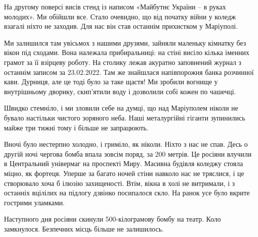 На другому поверсі висів стенд із написом «Майбутнє України – в руках молодих».
Ми обійшли все. Стало очевидно, що від початку війни у коледж взагалі ніхто не
заходив. Для нас він став останнім прихистком у Маріуполі. 

Ми залишился там увісьмох з нашими друзями, зайняли маленьку кімнатку без вікон
під сходами. Вона належала прибиральниці: на стіні висіло кілька іменних грамот
за її взірцеву роботу. На столику лежав акуратно заповнений журнал з останнім
записом за 23.02.2022. Там же знайшлася напівпорожня банка розчинної кави.
Дурниця, але це тоді було за таке щастя! Ми зробили вогнище у внутрішньому
дворику, скип'ятили воду і дозволили собі кожен по чашечці.

Швидко стемніло, і ми зловили себе на думці, що над Маріуполем ніколи не бувало
настільки чистого зоряного неба. Наші металургійні гіганти зупинились майже три
тижні тому і більше не запрацюють.

Вночі було нестерпно холодно, і гриміло, як ніколи. Ніхто з нас не спав. Десь о
другій ночі чергова бомба впала зовсім поряд, за 200 метрів. Це росіяни влучили
в Центральний універмаг на проспекті Миру. Масивна будівля коледжу стояла
міцно, як фортеця. Уперше за багато ночей стіни навколо нас не тряслися, і це
створювало хоча б ілюзію захищеності. Втім, вікна в холі не витримали, і з
останніх вцілілих на підлогу дзвінко посипалося скло. На ранок усе було вкрите
гострими уламками.

Наступного дня росіяни скинули 500-кілограмову бомбу на театр. Коло замкнулося.
Безпечних місць більше не залишилось.
